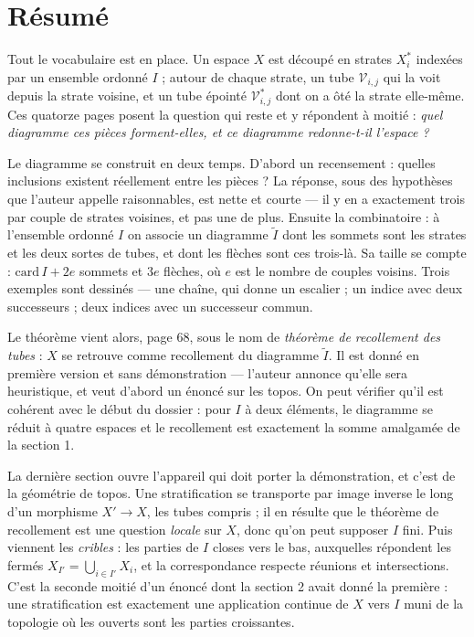 \documentclass[11pt,a4paper]{article}
\begin{document}
\section*{Résumé}

\begin{resume}
Tout le vocabulaire est en place. Un espace $X$ est découpé en strates
$X_{i}^{*}$ indexées par un ensemble ordonné $I$ ; autour de chaque strate, un
tube $\mathcal{V}_{i,j}$ qui la voit depuis la strate voisine, et un tube épointé
$\mathcal{V}^{*}_{i,j}$ dont on a ôté la strate elle-même. Ces quatorze pages
posent la question qui reste et y répondent à moitié : \emph{quel diagramme ces
pièces forment-elles, et ce diagramme redonne-t-il l'espace ?}

Le diagramme se construit en deux temps. D'abord un recensement : quelles
inclusions existent réellement entre les pièces ? La réponse, sous des
hypothèses que l'auteur appelle raisonnables, est nette et courte — il y en a
exactement trois par couple de strates voisines, et pas une de plus. Ensuite la
combinatoire : à l'ensemble ordonné $I$ on associe un diagramme $\widetilde{I}$
dont les sommets sont les strates et les deux sortes de tubes, et dont les
flèches sont ces trois-là. Sa taille se compte : $\mathrm{card}\,I + 2e$ sommets
et $3e$ flèches, où $e$ est le nombre de couples voisins. Trois exemples sont
dessinés — une chaîne, qui donne un escalier ; un indice avec deux successeurs ;
deux indices avec un successeur commun.

Le théorème vient alors, page 68, sous le nom de \emph{théorème de recollement
des tubes} : $X$ se retrouve comme recollement du diagramme $\widetilde{I}$. Il
est donné en première version et sans démonstration — l'auteur annonce qu'elle
sera heuristique, et veut d'abord un énoncé sur les topos. On peut vérifier
qu'il est cohérent avec le début du dossier : pour $I$ à deux éléments, le
diagramme se réduit à quatre espaces et le recollement est exactement la somme
amalgamée de la section 1.

La dernière section ouvre l'appareil qui doit porter la démonstration, et c'est
de la géométrie de topos. Une stratification se transporte par image inverse le
long d'un morphisme $X' \to X$, les tubes compris ; il en résulte que le
théorème de recollement est une question \emph{locale} sur $X$, donc qu'on peut
supposer $I$ fini. Puis viennent les \emph{cribles} : les parties de $I$ closes
vers le bas, auxquelles répondent les fermés $X_{I'} = \bigcup_{i \in I'} X_{i}$,
et la correspondance respecte réunions et intersections. C'est la seconde moitié
d'un énoncé dont la section 2 avait donné la première : une stratification est
exactement une application continue de $X$ vers $I$ muni de la topologie où les
ouverts sont les parties croissantes.


\end{resume}
\end{document}
